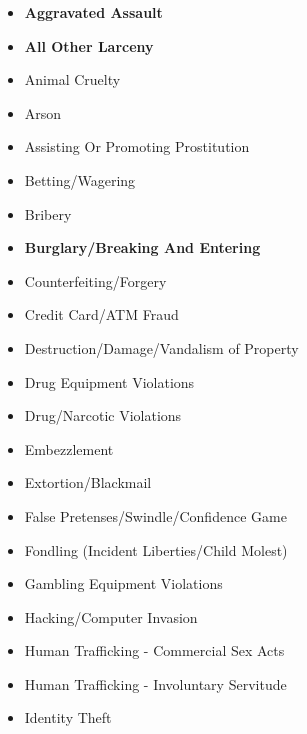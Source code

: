 \documentclass[
  12pt,
  openany]{book}
\providecommand{\tightlist}{%
  \setlength{\itemsep}{0pt}\setlength{\parskip}{0pt}}
\begin{document}
\begin{itemize}
\tightlist
\item
  \textbf{Aggravated Assault}\\
\item
  \textbf{All Other Larceny}\\
\item
  Animal Cruelty\\
\item
  Arson\\
\item
  Assisting Or Promoting Prostitution\\
\item
  Betting/Wagering\\
\item
  Bribery\\
\item
  \textbf{Burglary/Breaking And Entering}\\
\item
  Counterfeiting/Forgery\\
\item
  Credit Card/ATM Fraud\\
\item
  Destruction/Damage/Vandalism of Property\\
\item
  Drug Equipment Violations\\
\item
  Drug/Narcotic Violations\\
\item
  Embezzlement\\
\item
  Extortion/Blackmail\\
\item
  False Pretenses/Swindle/Confidence Game\\
\item
  Fondling (Incident Liberties/Child Molest)\\
\item
  Gambling Equipment Violations\\
\item
  Hacking/Computer Invasion\\
\item
  Human Trafficking - Commercial Sex Acts\\
\item
  Human Trafficking - Involuntary Servitude\\
\item
  Identity Theft\\

\end{itemize}
\end{document}
